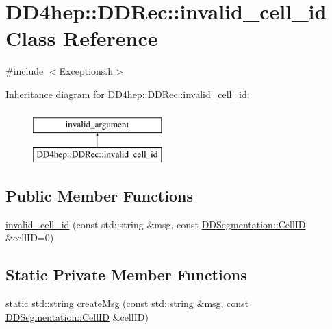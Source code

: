 \hypertarget{class_d_d4hep_1_1_d_d_rec_1_1invalid__cell__id}{}\section{D\+D4hep\+:\+:D\+D\+Rec\+:\+:invalid\+\_\+cell\+\_\+id Class Reference}
\label{class_d_d4hep_1_1_d_d_rec_1_1invalid__cell__id}


{\ttfamily \#include $<$Exceptions.\+h$>$}

Inheritance diagram for D\+D4hep\+:\+:D\+D\+Rec\+:\+:invalid\+\_\+cell\+\_\+id\+:\begin{figure}[H]
\begin{center}
\leavevmode
\includegraphics[height=2.000000cm]{class_d_d4hep_1_1_d_d_rec_1_1invalid__cell__id}
\end{center}
\end{figure}
\subsection*{Public Member Functions}
\begin{DoxyCompactItemize}
\item 
\hyperlink{class_d_d4hep_1_1_d_d_rec_1_1invalid__cell__id_a242e8977aced3fb69db5bba5f876fe99}{invalid\+\_\+cell\+\_\+id} (const std\+::string \&msg, const \hyperlink{namespace_d_d4hep_1_1_d_d_segmentation_ac7af071d85cb48820914434a07e21ba1}{D\+D\+Segmentation\+::\+Cell\+ID} \&cell\+ID=0)
\end{DoxyCompactItemize}
\subsection*{Static Private Member Functions}
\begin{DoxyCompactItemize}
\item 
static std\+::string \hyperlink{class_d_d4hep_1_1_d_d_rec_1_1invalid__cell__id_a62d6a8a99f7edcfe1a506f90640d76a6}{create\+Msg} (const std\+::string \&msg, const \hyperlink{namespace_d_d4hep_1_1_d_d_segmentation_ac7af071d85cb48820914434a07e21ba1}{D\+D\+Segmentation\+::\+Cell\+ID} \&cell\+ID)
\end{DoxyCompactItemize}



